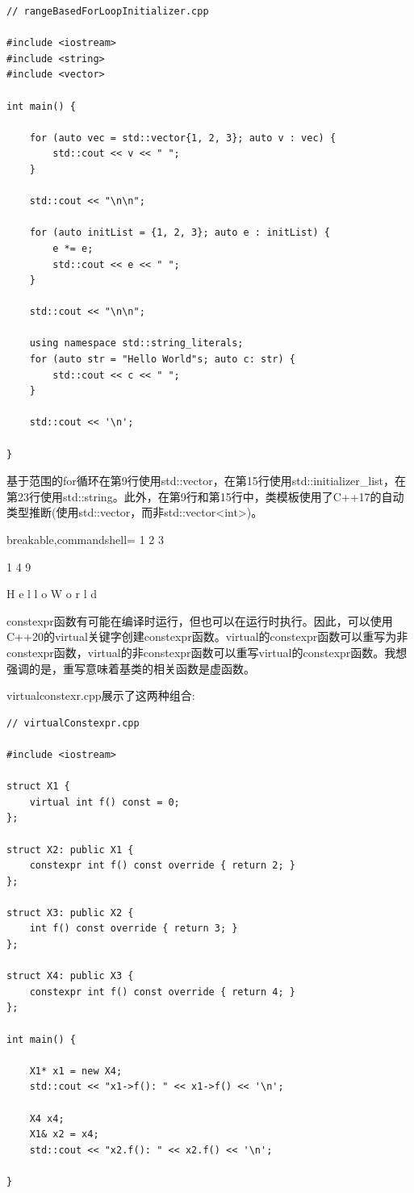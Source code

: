 \begin{lstlisting}[style=styleCXX]
// rangeBasedForLoopInitializer.cpp

#include <iostream>
#include <string>
#include <vector>

int main() {

	for (auto vec = std::vector{1, 2, 3}; auto v : vec) {
		std::cout << v << " ";
	}
	
	std::cout << "\n\n";
	
	for (auto initList = {1, 2, 3}; auto e : initList) {
		e *= e;
		std::cout << e << " ";
	}
	
	std::cout << "\n\n";
	
	using namespace std::string_literals;
	for (auto str = "Hello World"s; auto c: str) {
		std::cout << c << " ";
	}
	
	std::cout << '\n';

}
\end{lstlisting}

基于范围的for循环在第9行使用std::vector，在第15行使用std::initializer\_list，在第23行使用std::string。此外，在第9行和第15行中，类模板使用了C++17的自动类型推断(使用std::vector，而非std::vector<int>)。

\begin{tcblisting}{breakable,commandshell={}}
1 2 3

1 4 9

H e l l o  W o r l d
\end{tcblisting}


constexpr函数有可能在编译时运行，但也可以在运行时执行。因此，可以使用C++20的virtual关键字创建constexpr函数。virtual的constexpr函数可以重写为非constexpr函数，virtual的非constexpr函数可以重写virtual的constexpr函数。我想强调的是，重写意味着基类的相关函数是虚函数。

virtualconstexr.cpp展示了这两种组合:

\begin{lstlisting}[style=styleCXX]
// virtualConstexpr.cpp

#include <iostream>

struct X1 {
	virtual int f() const = 0;
};

struct X2: public X1 {
	constexpr int f() const override { return 2; }
};

struct X3: public X2 {
	int f() const override { return 3; }
};

struct X4: public X3 {
	constexpr int f() const override { return 4; }
};

int main() {
	
	X1* x1 = new X4;
	std::cout << "x1->f(): " << x1->f() << '\n';
	
	X4 x4;
	X1& x2 = x4;
	std::cout << "x2.f(): " << x2.f() << '\n';

}
\end{lstlisting}

